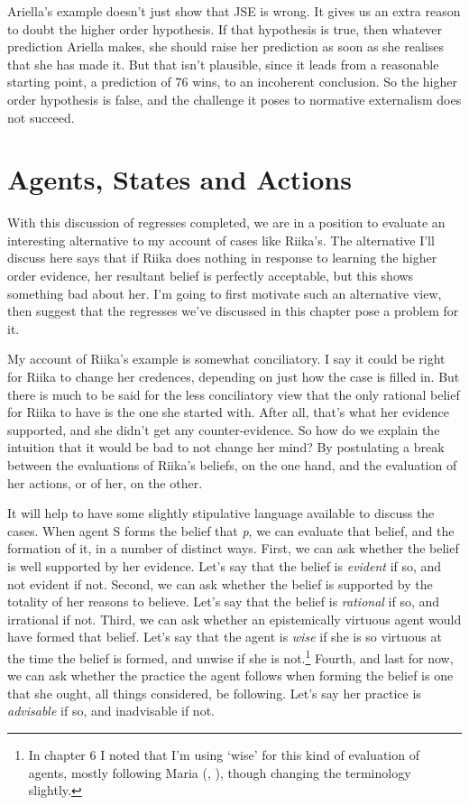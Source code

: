 \documentclass[
  10pt,
  letterpaper,
  twoside]{scrbook}
\begin{document}
{Ariella}'s example doesn't just show that JSE is wrong. It gives us an
extra reason to doubt the higher order hypothesis. If that hypothesis is
true, then whatever prediction {Ariella} makes, she should raise her
prediction as soon as she realises that she has made it. But that isn't
plausible, since it leads from a reasonable starting point, a prediction
of 76 wins, to an incoherent conclusion. So the higher order hypothesis
is false, and the challenge it poses to normative externalism does not
succeed.

\section{Agents, States and Actions}\label{agentsstatesandactions}

With this discussion of regresses completed, we are in a position to
evaluate an interesting alternative to my account of cases like
{Riika}'s. The alternative I'll discuss here says that if {Riika} does
nothing in response to learning the higher order evidence, her resultant
belief is perfectly acceptable, but this shows something bad about her.
I'm going to first motivate such an alternative view, then suggest that
the regresses we've discussed in this chapter pose a problem for it.

My account of {Riika}'s example is somewhat conciliatory. I say it could
be right for {Riika} to change her credences, depending on just how the
case is filled in. But there is much to be said for the less
conciliatory view that the only rational belief for {Riika} to have is
the one she started with. After all, that's what her evidence supported,
and she didn't get any counter-evidence. So how do we explain the
intuition that it would be bad to not change her mind? By postulating a
break between the evaluations of {Riika}'s beliefs, on the one hand, and
the evaluation of her actions, or of her, on the other.

It will help to have some slightly stipulative language available to
discuss the cases. When agent S forms the belief that \emph{p}, we can
evaluate that belief, and the formation of it, in a number of distinct
ways. First, we can ask whether the belief is well supported by her
evidence. Let's say that the belief is \emph{evident} if so, and not
evident if not. Second, we can ask whether the belief is supported by
the totality of her reasons to believe. Let's say that the belief is
\emph{rational} if so, and irrational if not. Third, we can ask whether
an epistemically virtuous agent would have formed that belief. Let's say
that the agent is \emph{wise} if she is so virtuous at the time the
belief is formed, and unwise if she is not.\footnote{In chapter 6 I
  noted that I'm using `wise' for this kind of evaluation of agents,
  mostly following Maria
  (,
  ), though changing the
  terminology slightly.} Fourth, and last for now, we can ask whether
the practice the agent follows when forming the belief is one that she
ought, all things considered, be following. Let's say her practice is
\emph{advisable} if so, and inadvisable if not.
\end{document}
